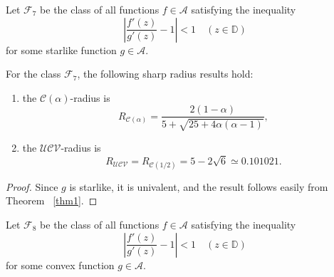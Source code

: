 \documentclass{amsart}
\begin{document}
Let $\mathcal{F}_7$ be the class of all functions $f\in \mathcal{A}$ satisfying the inequality
\[   \left|\frac{f'(z)}{g'(z)}-1\right|<1\quad ( z\in \mathbb{D})\]
for some starlike function $g\in \mathcal{A}$.

\begin{theorem}\label{thm2}
For the class $\mathcal{F}_7$,    the following sharp radius results hold:
\begin{enumerate}
\item\label{i21} the ${\mathcal{C}(\alpha)}$-radius  is
\[R_{\mathcal{C}(\alpha)}=\frac{2(1-\alpha)}{5+\sqrt{25+4\alpha(\alpha-1)}},\]
\item\label{i22} the ${\mathcal{UCV}}$-radius  is
\[R_{\mathcal{UCV}}= R_{\mathcal{C}( 1/2)}=5-2\sqrt{6}\simeq0.101021 .\]
\end{enumerate}
\end{theorem}
\begin{proof}Since $g$ is starlike, it is univalent, and the result follows easily from Theorem ~\ref{thm1}.
\end{proof}

Let $\mathcal{F}_8$ be the class of all functions $f\in \mathcal{A}$ satisfying the inequality
\[   \left|\frac{f'(z)}{g'(z)}-1\right|<1\quad ( z\in \mathbb{D})\]
for some convex function $g\in \mathcal{A}$.
\end{document}

